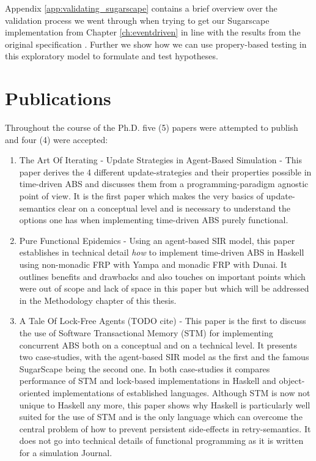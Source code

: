 \medskip

Appendix \ref{app:validating_sugarscape} contains a brief overview over the validation process we went through when trying to get our Sugarscape implementation from Chapter \ref{ch:eventdriven} in line with the results from the original specification \cite{epstein_growing_1996}. Further we show how we can use propery-based testing in this exploratory model to formulate and test hypotheses.

\newpage

\section{Publications}
Throughout the course of the Ph.D. five (5) papers were attempted to publish and four (4) were accepted:

\begin{enumerate}
	\item The Art Of Iterating - Update Strategies in Agent-Based Simulation \cite{thaler_art_2017} - This paper derives the 4 different update-strategies and their properties possible in time-driven ABS and discusses them from a programming-paradigm agnostic point of view. It is the first paper which makes the very basics of update-semantics clear on a conceptual level and is necessary to understand the options one has when implementing time-driven ABS purely functional.
	
	\item Pure Functional Epidemics \cite{thaler_pure_2019} - Using an agent-based SIR model, this paper establishes in technical detail \textit{how} to implement time-driven ABS in Haskell using non-monadic FRP with Yampa and monadic FRP with Dunai. It outlines benefits and drawbacks and also touches on important points which were out of scope and lack of space in this paper but which will be addressed in the Methodology chapter of this thesis.
	
	\item A Tale Of Lock-Free Agents (TODO cite) - This paper is the first to discuss the use of Software Transactional Memory (STM) for implementing concurrent ABS both on a conceptual and on a technical level. It presents two case-studies, with the agent-based SIR model as the first and the famous SugarScape being the second one. In both case-studies it compares performance of STM and lock-based implementations in Haskell and object-oriented implementations of established languages. Although STM is now not unique to Haskell any more, this paper shows why Haskell is particularly well suited for the use of STM and is the only language which can overcome the central problem of how to prevent persistent side-effects in retry-semantics. It does not go into technical details of functional programming as it is written for a simulation Journal.


\end{enumerate}
